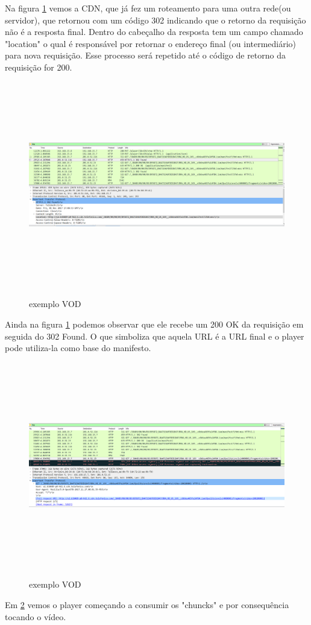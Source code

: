 Na figura \ref{figura:exemplo_vod_3} vemos a CDN, que j\'a fez um roteamento para uma outra rede(ou servidor), que retornou com um c\'odigo 302 indicando que o retorno da requisi\c{c}\~ao n\~ao \'e a resposta final. Dentro do cabe\c{c}alho da resposta tem um campo chamado "location" o qual \'e respons\'avel por retornar o endere\c{c}o final (ou intermedi\'ario) para nova requisi\c{c}\~ao. Esse processo ser\'a repetido at\'e o c\'odigo de retorno da requisi\c{c}\~ao for 200.
\begin{figure}[h]
\caption{exemplo VOD}
\includegraphics[height=9cm]{Figuras/exemplo_vod_3.png} 
\label{figura:exemplo_vod_3}
\end{figure}

Ainda na figura \ref{figura:exemplo_vod_3} podemos observar que ele recebe um 200 OK da requisi\c{c}\~ao em seguida do 302 Found. O que simboliza que aquela URL \'e a URL final e o player pode utiliza-la como base do manifesto. 

\begin{figure}[h]
\caption{exemplo VOD}
\includegraphics[height=9cm,left]{Figuras/exemplo_vod_4.png}
\label{figura:exemplo_vod_4}
\end{figure}

Em \ref{figura:exemplo_vod_4} vemos o player come\c{c}ando a consumir os "chuncks" e por consequ\^encia tocando o v\'ideo.